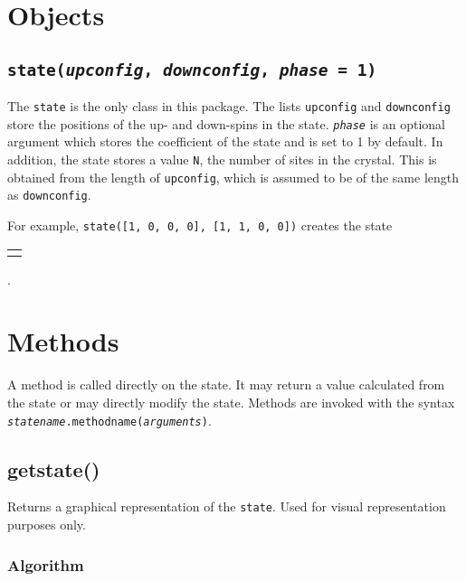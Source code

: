 \documentclass[]{book}
\newcommand*\dwn{\fbox{$\mathord\downharpoonleft\phantom{\upharpoonright}$}}%
\newcommand*\updwn{\fbox{$\upharpoonleft\downharpoonright$}}%
\newcommand*\emp{\fbox{$\phantom{\downharpoonright}\phantom{\downharpoonright}$}}%
\newcommand{\electron}[2]{{%
		\setlength\tabcolsep{0pt}%
		\begin{tabular}{c}
			\fboxsep=0pt\fbox{\fboxsep=3pt#2}\\[2pt]
			#1
		\end{tabular}%
}}
\begin{document}
\section{Objects}
\subsection{\texttt{state(\textit{upconfig}, \textit{downconfig}, \textit{phase} = 1)}}
The \texttt{state} is the only class in this package. The lists \texttt{upconfig} and \texttt{downconfig} store the positions of the up- and down-spins in the state. \texttt{\textit{phase}} is an optional argument which stores the coefficient of the state and is set to 1 by default. In addition, the state stores a value \texttt{N}, the number of sites in the crystal. This is obtained from the length of \texttt{upconfig}, which is assumed to be of the same length as \texttt{downconfig}.

For example, \texttt{state([1, 0, 0, 0], [1, 1, 0, 0])} creates the state \electron{}{\updwn\dwn\emp\emp}.

\section{Methods}
A method is called directly on the state. It may return a value calculated from the state or may directly modify the state. Methods are invoked with the syntax \texttt{\textit{statename}.methodname(\textit{arguments})}.

\subsection{getstate()}
Returns a graphical representation of the \texttt{state}. Used for visual representation purposes only.
\subsubsection*{Algorithm}
\end{document}
